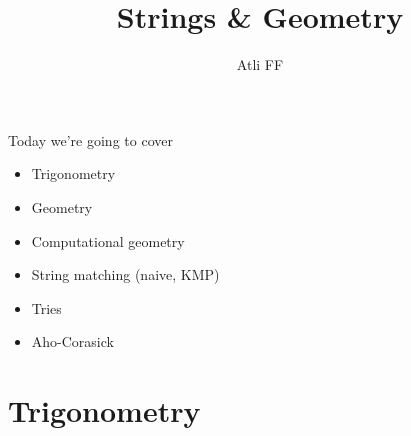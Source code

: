 \documentclass{beamer}
\title{Strings \& Geometry}
\author{Atli FF}
\institute{\href{http://ru.is/td}{School of Computer Science} \\[2pt] \href{http://ru.is}{Reykjavík University}}
\begin{document}
\maketitle

\begin{frame}[plain]{Today we're going to cover}
    \begin{itemize}
        \item Trigonometry
        \item Geometry
        \item Computational geometry
        \item String matching (naive, KMP)
        \item Tries
        \item Aho-Corasick
    \end{itemize}
\end{frame}

\section*{Trigonometry}
\end{document}
